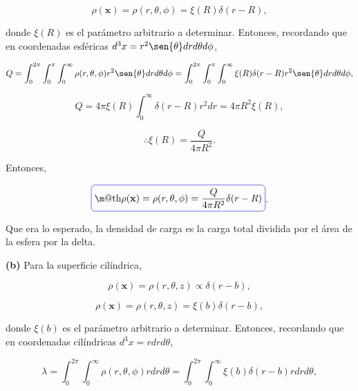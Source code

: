 \documentclass[a4paper,10pt]{article}
\makeatletter
\numberwithin{equation}{section}
\newcommand*{\boxcolor}{blue}
\renewcommand{\boxed}[1]{\textcolor{\boxcolor}{%
\tikz[baseline={([yshift=-1ex]current bounding box.center)}] \node [rectangle, minimum width=1ex,rounded corners,draw] {\normalcolor\m@th$\displaystyle#1$};}}
\makeatother
\begin{document}
\begin{equation}
 \rho(\mathbf{x}) =  \rho(r,\theta,\phi) = \xi(R)\delta(r-R),
\end{equation}

donde $\xi(R)$ es el parámetro arbitrario a determinar. Entonces, recordando que 
en coordenadas esféricas $d^3x = r^2\sen{\theta}dr d\theta d\phi$, 

\begin{equation*}
 Q = \int_0^{2\pi} \int_0^\pi \int_0^\infty 
  \rho(r,\theta,\phi) r^2\sen{\theta}dr d\theta d\phi = 
  \int_0^{2\pi} \int_0^\pi \int_0^\infty \xi(R)\delta(r-R)
  r^2\sen{\theta}dr d\theta d\phi,
\end{equation*}

\begin{equation}
 Q = 4\pi\xi(R) \int_0^\infty \delta(r-R) r^2dr = 4\pi R^2 \xi(R),
\end{equation}

\begin{equation}
\therefore \xi(R) = \frac{Q}{4\pi R^2}.
\end{equation}

Entonces, 

\begin{equation}
 \boxed{\rho(\mathbf{x}) =  \rho(r,\theta,\phi) = \frac{Q}{4\pi R^2}\delta(r-R)}.
\end{equation}

\vspace{.3cm}

Que era lo esperado, la densidad de carga es la carga total dividida por el área de
la esfera por la delta.

\vspace{.3cm}

\textbf{(b)} Para la superficie cilíndrica, 

\begin{equation}
 \rho(\mathbf{x}) =  \rho(r,\theta,z) \propto \delta(r - b),
\end{equation}

\begin{equation}
 \rho(\mathbf{x}) =  \rho(r,\theta,z) = \xi(b) \delta(r - b),
\end{equation}

donde $\xi(b)$ es el parámetro arbitrario a determinar. Entonces, recordando que 
en coordenadas cilíndricas $d^3x = rdr d\theta$, 

\begin{equation*}
 \lambda = \int_0^{2\pi} \int_0^\infty 
  \rho(r,\theta,\phi) rdr d\theta = 
  \int_0^{2\pi} \int_0^\infty \xi(b)\delta(r-b)
  r drd\theta,
\end{equation*}
\end{document}
